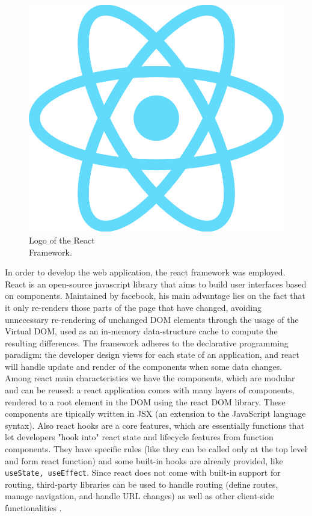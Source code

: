 \begin{figure} %
    \captionsetup{font=footnotesize}
    \centering
    \includegraphics[width=\linewidth]{images/react.png}
    \caption{Logo of the React\\Framework.}
\end{figure}

In order to develop the web application, the react framework was employed. React is an open-source javascript library that aims to build user interfaces based on components. Maintained by facebook, his main advantage lies on the fact that it only re-renders those parts of the page that have changed, avoiding unnecessary re-rendering of unchanged DOM elements through the usage of the Virtual DOM, used as an in-memory data-structure cache to compute the resulting differences. The framework adheres to the declarative programming paradigm: the developer design views for each state of an application, and react will handle update and render of the components when some data changes. Among react main characteristics we have the components, which are modular and can be reused: a react application comes with many layers of components, rendered to a root element in the DOM using the react DOM library. These components are tipically written in JSX (an extension to the JavaScript language syntax). Also react hooks are a core features, which are essentially functions that let developers "hook into" react state and lifecycle features from function components. They have specific rules (like they can be called only at the top level and form react function) and some built-in hooks are already provided, like \texttt{useState, useEffect}. Since react does not come with built-in support for routing, third-party libraries can be used to handle routing (define routes, manage navigation, and handle URL changes) as well as other client-side functionalities \cite{React}. 
\newpage
